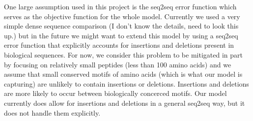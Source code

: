 One large assumption used in this project is the seq2seq error function which serves as the objective function for the whole model. Currently we used a very simple dense sequence comparison (I don't know the details, need to look this up.) but in the future we might want to extend this model by using a seq2seq error function that explicitly accounts for insertions and deletions present in biological sequences. For now, we consider this problem to be mitigated in part by focusing on relatively small peptides (less than 100 amino acids) and we assume that small conserved motifs of amino acids (which is what our model is capturing) are unlikely to contain insertions or deletions. Insertions and deletions are more likely to occur between biologically concerced motifs. Our model currently does allow for insertions and deletions in a general seq2seq way, but it does not handle them explicitly.


